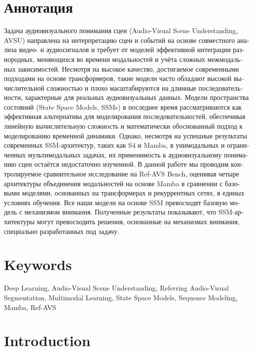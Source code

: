 \documentclass[a4paper,12pt]{extarticle}
\begin{document}
\section*{\foreignlanguage{russian}{Аннотация}}   %
\foreignlanguage{russian}{
Задача аудиовизуального понимания сцен (Audio-Visual Scene Understanding, AVSU) направлена на интерпретацию сцен и событий на основе совместного анализа видео- и аудиосигналов и требует от моделей эффективной интеграции разнородных, меняющихся во времени модальностей и учёта сложных межмодальных зависимостей. Несмотря на высокое качество, достигаемое современными подходами на основе трансформеров, такие модели часто обладают высокой вычислительной сложностью и плохо масштабируются на длинные последовательности, характерные для реальных аудиовизуальных данных. Модели пространства состояний (State Space Models, SSMs) в последнее время рассматриваются как эффективная альтернатива для моделирования последовательностей, обеспечивая линейную вычислительную сложность и математически обоснованный подход к моделированию временной динамики. Однако, несмотря на успешные результаты современных SSM-архитектур, таких как S4 и Mamba, в унимодальных и ограниченных мультимодальных задачах, их применимость к аудиовизуальному пониманию сцен остаётся недостаточно изученной. В данной работе мы проводим контролируемое сравнительное исследование на Ref-AVS Bench, оценивая четыре архитектуры объединения модальностей на основе Mamba в сравнении с базовыми моделями, основанных на трансформерах и рекуррентных сетях, в единых условиях обучения. Все наши модели на основе SSM превосходят базовую модель с механизмом внимания. Полученные результаты показывают, что SSM-архитектуры могут превосходить решения, основанные на механизмах внимания, специально разработанных под задачу.
}

\section*{Keywords}
Deep Learning,
Audio-Visual Scene Understanding,
Referring Audio-Visual Segmentation,
Multimodal Learning,
State Space Models,
Sequence Modeling,
Mamba,
Ref-AVS
\pagebreak

\section{Introduction}
\end{document}
